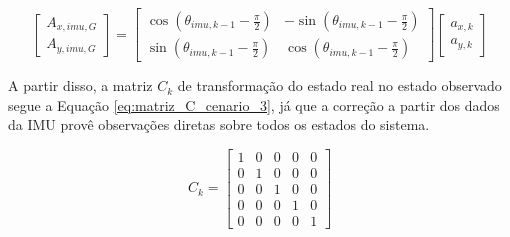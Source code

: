 \documentclass[acronym, symbols, table, deposito]{fei}
\begin{document}
		
			\begin{equation}\label{eq:calculo_aceleracoes_globais_imu}
				\begin{bmatrix}
					A_{x,imu,G} \\
					A_{y,imu,G}
				\end{bmatrix} = 
				\begin{bmatrix}
					\cos(\theta_{imu,k-1} - \frac{\pi}{2}) & -\sin(\theta_{imu,k-1} - \frac{\pi}{2}) \\
					\sin(\theta_{imu,k-1} - \frac{\pi}{2}) & \cos(\theta_{imu,k-1} - \frac{\pi}{2})
				\end{bmatrix}
				\begin{bmatrix}
					a_{x,k} \\
					a_{y,k}
				\end{bmatrix}
			\end{equation}
		
		
			A partir disso, a matriz $C_k$ de transformação do estado real no estado observado segue a Equação \eqref{eq:matriz_C_cenario_3}, já que a correção a partir dos dados da IMU provê observações diretas sobre todos os estados do sistema.
			
			\begin{equation}\label{eq:matriz_C_cenario_3}
				C_{k} = \begin{bmatrix}
					1 & 0 & 0 & 0 & 0 \\
					0 & 1 & 0 & 0 & 0 \\
					0 & 0 & 1 & 0 & 0 \\
					0 & 0 & 0 & 1 & 0 \\
					0 & 0 & 0 & 0 & 1
				\end{bmatrix}
			\end{equation}
		
\end{document}
